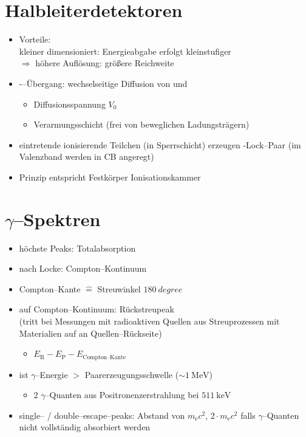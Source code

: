 \documentclass[BCOR=5mm,DIV=calc,listof=totoc,headings=big]{scrartcl}
\begin{document}
\section{Halbleiterdetektoren}
\label{sec:halbleiterdetektoren}
\begin{itemize}
\item Vorteile:\\
  kleiner dimensioniert: Energieabgabe erfolgt kleinstufiger\\
  $\Rightarrow$ höhere Auflösung: größere Reichweite
\item \Pproton-\Pneutron--Übergang: wechselseitige Diffusion von
  \Pelectron und \Pproton
  \begin{itemize}
  \item Diffusionsspannung $V_{0}$
  \item Verarmungsschicht (frei von beweglichen Ladungsträgern)
  \end{itemize}
\item eintretende ionisierende Teilchen (in Sperrschicht) erzeugen
  \Pelectron-Lock--Paar (\Pelectron im Valenzband werden in CB angeregt)
\item Prinzip entspricht Festkörper Ionisationskammer
\end{itemize}

\section{$\gamma$--Spektren}
\label{sec:gamma-spektren}
\begin{itemize}
\item höchste Peaks: Totalabsorption
\item nach Locke: Compton--Kontinuum
\item Compton--Kante $\hat{=}$ Streuwinkel $\SI{180}{degree}$
\item auf Compton--Kontinuum: Rückstreupeak\\
  (tritt bei Messungen mit radioaktiven Quellen aus Streuprozessen mit
  Materialien auf an Quellen--Rückseite)
  \begin{itemize}
  \item $E_{\mathrm{R}}-E_{\mathrm{P}}-E_{\text{Compton--Kante}}$
  \end{itemize}
\item ist $\gamma$--Energie $>$ Paarerzeugungsschwelle ($\sim \SI{1}{\MeV}$)
  \begin{itemize}
  \item 2 $\gamma$--Quanten aus Positronenzerstrahlung bei $\SI{511}{\keV}$
  \end{itemize}
\item single-- / double--escape--peaks: Abstand von
  $m_{\mathrm{e}}c^{2}$, $2 \cdot m_{\mathrm{e}}c^{2}$ falls
  $\gamma$--Quanten nicht vollständig absorbiert werden
\end{itemize}
\end{document}
